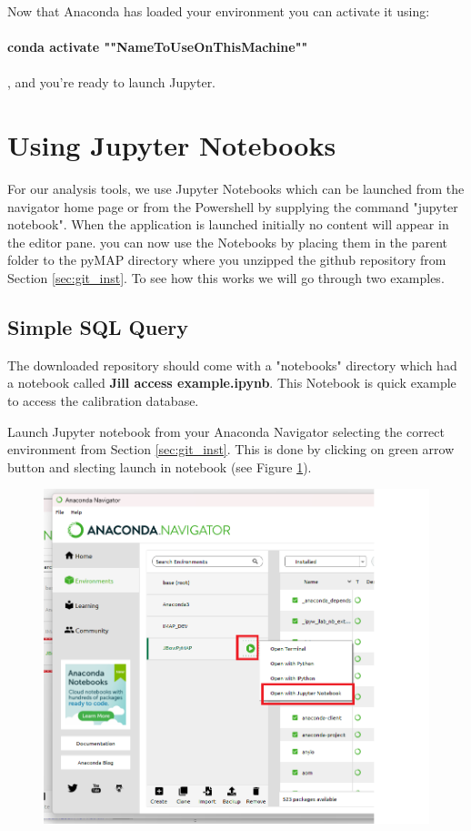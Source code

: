 \documentclass{article}
\begin{document}
Now that Anaconda has loaded your environment you can activate it using: \\ \\
\textbf{conda activate  ""NameToUseOnThisMachine"" } \\ \\

 , and you're ready to launch Jupyter.


 \section{Using Jupyter Notebooks}

 For our analysis tools, we use Jupyter Notebooks which can be launched from the navigator home page or from the Powershell by supplying the command "jupyter notebook". When the application is launched initially no content will appear in the editor pane. you can now use the Notebooks by placing them in the parent folder to the pyMAP directory where you unzipped the github repository from Section \ref{sec:git_inst}. To see how this works we will go through two examples. 

\subsection{Simple SQL Query}
The downloaded repository should come with a "notebooks" directory which had a notebook called \textbf{Jill access example.ipynb}. This Notebook is quick example to access the calibration database.

Launch Jupyter notebook from your Anaconda Navigator selecting the correct environment from Section \ref{sec:git_inst}. This is done by clicking on green arrow button and slecting launch in notebook (see Figure \ref{fig:launch Jup from nav}).
 
 
\begin{figure}[H]
\centering
\includegraphics[scale=0.4]{launch_jup.png}
\label{fig:launch Jup from nav}
\end{figure}
\end{document}

